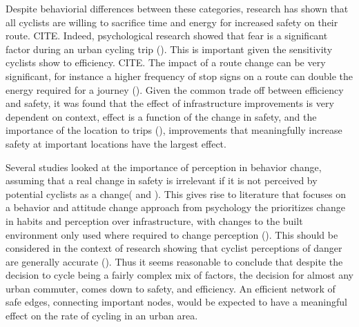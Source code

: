 \documentclass[11pt]{article} %
\begin{document}
Despite behaviorial differences between these categories, research has shown that all cyclists are willing to sacrifice time and energy for increased safety on their route. CITE. Indeed, psychological research showed that fear is a significant factor during an urban cycling trip (\cite{ellett2018state}). This is important given the sensitivity cyclists show to efficiency. CITE. The impact of a route change can be very significant, for instance a higher frequency of stop signs on a route can double the energy required for a journey (\cite{fajans2001bicyclists}). Given the common trade off between efficiency and safety, it was found that the effect of infrastructure improvements is very dependent on context, effect is a function of the change in safety, and the importance of the location to trips (\cite{kondo2018bike}), improvements that meaningfully increase safety at important locations have the largest effect. 

Several studies looked at the importance of perception in behavior change, assuming that a real change in safety is irrelevant if it is not perceived by potential cyclists as a change(\cite{li2012physical} and \cite{parkin2007models}). This gives rise to literature that focuses on a behavior and attitude change approach from psychology the prioritizes change in habits and perception over infrastructure, with changes to the built environment only used where required to change perception (\cite{savan2017integrated}). This should be considered in the context of research showing that cyclist perceptions of danger are generally accurate (\cite{vandenbulcke2014predicting}). Thus it seems reasonable to conclude that despite the decision to cycle being a fairly complex mix of factors, the decision for almost any urban commuter, comes down to safety, and efficiency. An efficient network of safe edges, connecting important nodes, would be expected to have a meaningful effect on the rate of cycling in an urban area.  
\end{document}
